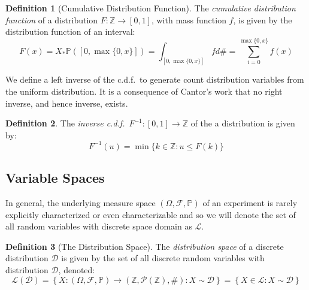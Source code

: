 \documentclass[a4paper,11pt,oneside]{book}
\theoremstyle{plain}
\theoremstyle{definition}
\newtheorem{defn}{Definition}[section]
\begin{document}
\begin{defn}[Cumulative Distribution Function]
The \emph{cumulative distribution function} of a distribution $F:\mathbb{Z}\rightarrow [0,1]$, with mass function $f$, is given by the distribution function of an interval:
\[F(x)=X_*\mathbb{P}([0,\max\{0,x\}])=\int_{[0,\max\{0,x\}]}fd\#=\sum_{i=0}^{\max\{0,x\}}f(x)\]
\end{defn}
We define a left inverse of the c.d.f.~to generate count distribution variables from the uniform distribution. It is a consequence of Cantor's work that no right inverse, and hence inverse, exists.
\begin{defn}
The \emph{inverse c.d.f.}~$F^{-1}:[0,1] \rightarrow \mathbb{Z}$ of the a distribution is given by:
\[F^{-1}(u)=\min\{k \in \mathbb{Z}: u \le F(k)\}\]
\end{defn}
\subsection{Variable Spaces}
In general, the underlying measure space $(\Omega, \mathcal{F},\mathbb{P})$ of an experiment is rarely explicitly characterized or even characterizable and so we will denote the set of all random variables with discrete space domain as $\mathcal{L}$.
\begin{defn}[The Distribution Space]
The \emph{distribution space} of a discrete distribution $\mathcal{D}$ is given by the set of all discrete random variables with distribution $\mathcal{D}$, denoted:
\[\mathcal{L}(\mathcal{D})=\left\{X:(\Omega, \mathcal{F},\mathbb{P})\rightarrow (\mathbb{Z},\mathcal{P}(\mathbb{Z}),\#) : X \sim \mathcal{D} \right\}=\left\{X \in \mathcal{L} : X \sim \mathcal{D} \right\}\]
\end{defn}
\end{document}
